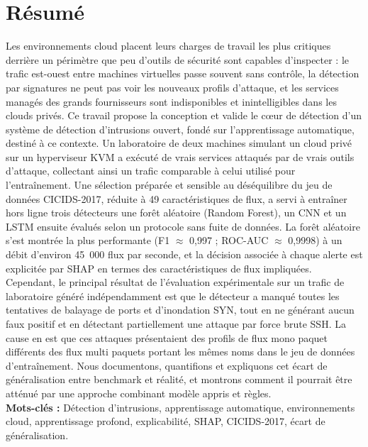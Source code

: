 \documentclass[12pt, a4paper, oneside]{report}
\begin{document}
\newpage

\chapter*{Résumé}
\noindent

Les environnements cloud placent leurs charges de travail les plus critiques derrière un périmètre que peu d'outils de sécurité sont capables d'inspecter : le trafic est-ouest entre machines virtuelles passe souvent sans contrôle, la détection par signatures ne peut pas voir les nouveaux profils d'attaque, et les services managés des grands fournisseurs sont indisponibles et inintelligibles dans les clouds privés. Ce travail propose la conception et valide le c\oe{}ur de détection d'un système de détection d'intrusions ouvert, fondé sur l'apprentissage automatique, destiné à ce contexte. Un laboratoire de deux machines simulant un cloud privé sur un hyperviseur KVM a exécuté de vrais services attaqués par de vrais outils d'attaque, collectant ainsi un trafic comparable à celui utilisé pour l'entraînement. Une sélection préparée et sensible au déséquilibre du jeu de données CICIDS-2017, réduite à 49 caractéristiques de flux, a servi à entraîner hors ligne trois détecteurs  une forêt aléatoire (Random Forest), un CNN et un LSTM  ensuite évalués selon un protocole sans fuite de données. La forêt aléatoire s'est montrée la plus performante (F1 $\approx$ 0,997 ; ROC-AUC $\approx$ 0,9998) à un débit d'environ 45~000 flux par seconde, et la décision associée à chaque alerte est explicitée par SHAP en termes des caractéristiques de flux impliquées. Cependant, le principal résultat de l'évaluation expérimentale sur un trafic de laboratoire généré indépendamment est que le détecteur a manqué toutes les tentatives de balayage de ports et d'inondation SYN, tout en ne générant aucun faux positif et en détectant partiellement une attaque par force brute SSH. La cause en est que ces attaques présentaient des profils de flux mono paquet différents des flux multi paquets portant les mêmes noms dans le jeu de données d'entraînement. Nous documentons, quantifions et expliquons cet écart de généralisation entre benchmark et réalité, et montrons comment il pourrait être atténué par une approche combinant modèle appris et règles.\\[1em]

\noindent\textbf{Mots-clés :} Détection d'intrusions, apprentissage automatique, environnements cloud, apprentissage profond, explicabilité, SHAP, CICIDS-2017, écart de généralisation.
\end{document}
